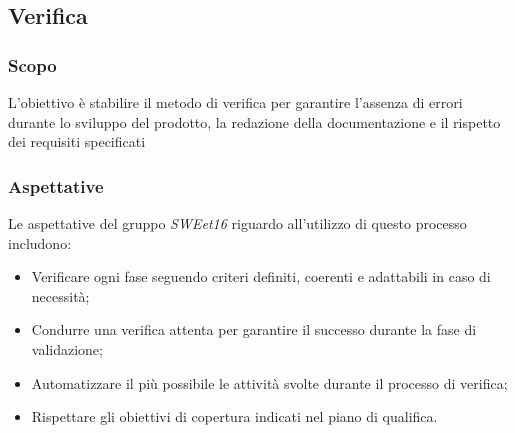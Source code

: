 \pagebreak
\subsection{Verifica}
\subsubsection{Scopo}
L'obiettivo è stabilire il metodo di verifica per garantire l'assenza
di errori durante lo sviluppo del prodotto, la redazione della documentazione
e il rispetto dei requisiti specificati
\subsubsection{Aspettative}
Le aspettative del gruppo \emph{SWEet16} riguardo all'utilizzo di questo processo includono:
\begin{itemize}
    \item Verificare ogni fase seguendo criteri definiti, coerenti e adattabili in caso di necessità;
    \item Condurre una verifica attenta per garantire il successo durante la fase di validazione;
    \item Automatizzare il più possibile le attività svolte durante il processo di verifica;
    \item Rispettare gli obiettivi di copertura indicati nel piano di qualifica.
\end{itemize}
